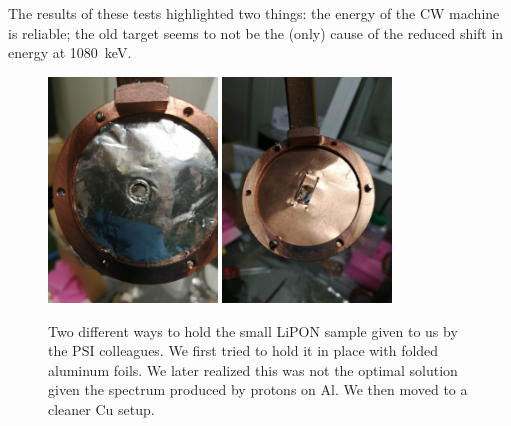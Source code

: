 \begin{refsection}
        \noindent
        The results of these tests highlighted two things: the energy of the CW machine is reliable; the old target seems to not be the (only) cause of the reduced shift in energy at \SI{1080}{keV}.
    
    \begin{figure}
        \centering
        \includegraphics[width = 0.4\textwidth]{Figures/X17/Dec2023/X17_Dec2023_AlTarget.jpeg}
        \includegraphics[width = 0.4\textwidth]{Figures/X17/Dec2023/X17_Dec2023_CuTarget.jpeg}
        \caption[X17: Small LiPON target setup]{Two different ways to hold the small LiPON sample given to us by the PSI colleagues. We first tried to hold it in place with folded aluminum foils. We later realized this was not the optimal solution given the spectrum produced by protons on Al. We then moved to a cleaner Cu setup.}
        \label{fig:X17:target:LiPON:psi}
    \end{figure}
    \begin{figure}
        \centering


\end{figure}
\end{refsection}
